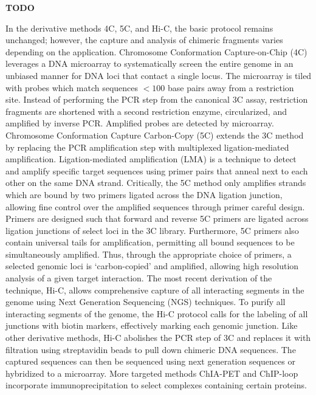 \textbf{TODO}
%
%

In the derivative methods 4C, 5C, and Hi-C, the basic protocol remains
unchanged; however, the capture and analysis of chimeric fragments varies
depending on the application.  Chromosome Conformation Capture-on-Chip (4C)
leverages a DNA microarray to systematically screen the entire genome in an
unbiased manner for DNA loci that contact a single locus\cite{simonis2006}.
The microarray is tiled with probes which match sequences $< 100$ base pairs
away from a restriction site.  Instead of performing the PCR step from the
canonical 3C assay, restriction fragments are shortened with a second restriction
enzyme, circularized, and amplified by inverse PCR\@.  Amplified probes
are detected by microarray\cite{simonis2006}.  Chromosome Conformation Capture Carbon-Copy (5C)
extends the 3C method by replacing the PCR amplification step with multiplexed
ligation-mediated amplification.  Ligation-mediated amplification (LMA) is a
technique to detect and amplify specific target sequences using primer pairs
that anneal next to each other on the same DNA strand\cite{dostie2006}.
Critically, the 5C method only amplifies strands which are bound by two
primers ligated across the DNA ligation junction, allowing fine control over
the amplified sequences through primer careful design.  Primers are
designed such that forward and reverse 5C primers are ligated across ligation
junctions of select loci in the 3C library.
Furthermore, 5C primers also contain universal tails for amplification,
permitting all bound sequences to be simultaneously amplified.  Thus, through
the appropriate choice of primers, a selected genomic loci is `carbon-copied'
and amplified, allowing high resolution analysis of a given target
interaction\cite{dostie2006}.  The most recent derivation of the technique,
Hi-C, allows comprehensive capture of all interacting segments in the genome
using Next Generation Sequencing (NGS) techniques.  To purify all interacting
segments of the genome, the Hi-C protocol calls for the labeling of all junctions
with biotin markers, effectively marking each genomic junction. Like other
derivative methods, Hi-C abolishes the PCR step of 3C and replaces it with filtration
using streptavidin beads to pull down chimeric DNA sequences.  The captured sequences
can then be sequenced using next generation sequences or hybridized to a
microarray.  More targeted methods ChIA-PET and ChIP-loop incorporate
immunoprecipitation to select complexes containing certain proteins.

